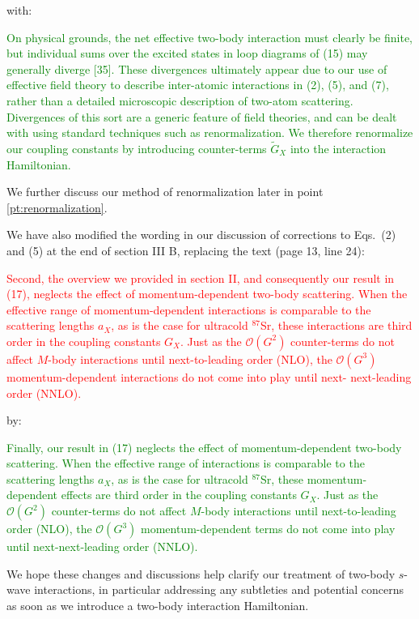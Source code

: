 \documentclass[preprint]{revtex4-1}
\newcommand{\p}[1]{\left(#1\right)} %
\renewcommand{\O}{\mathcal{O}}
\newcommand{\1}{\mathds{1}}
\newcommand{\red}[1]{\textcolor{red}{#1}}
\newcommand{\green}[1]{\textcolor{green}{#1}}
\begin{document}
\begin{enumerate}
  with:

  \green{On physical grounds, the net effective two-body interaction
    must clearly be finite, but individual sums over the excited
    states in loop diagrams of (15) may generally diverge [35].  These
    divergences ultimately appear due to our use of effective field
    theory to describe inter-atomic interactions in (2), (5), and (7),
    rather than a detailed microscopic description of two-atom
    scattering.  Divergences of this sort are a generic feature of
    field theories, and can be dealt with using standard techniques
    such as renormalization.  We therefore renormalize our coupling
    constants by introducing counter-terms $\tilde G_X$ into the
    interaction Hamiltonian.}

  We further discuss our method of renormalization later in point
  \ref{pt:renormalization}.

  We have also modified the wording in our discussion of corrections
  to Eqs.~(2) and (5) at the end of section III B, replacing the text
  (page 13, line 24):

  \red{Second, the overview we provided in section II, and
    consequently our result in (17), neglects the effect of
    momentum-dependent two-body scattering. When the effective range
    of momentum-dependent interactions is comparable to the scattering
    lengths $a_X$, as is the case for ultracold ${}^{87}$Sr, these
    interactions are third order in the coupling constants $G_X$. Just
    as the $\O\p{G^2}$ counter-terms do not affect $M$-body
    interactions until next-to-leading order (NLO), the $\O\p{G^3}$
    momentum-dependent interactions do not come into play until next-
    next-leading order (NNLO).}

  by:

  \green{Finally, our result in (17) neglects the effect of
    momentum-dependent two-body scattering.  When the effective range
    of interactions is comparable to the scattering lengths $a_X$, as
    is the case for ultracold ${}^{87}$Sr, these momentum-dependent
    effects are third order in the coupling constants $G_X$.  Just as
    the $\O\p{G^2}$ counter-terms do not affect $M$-body interactions
    until next-to-leading order (NLO), the $\O\p{G^3}$
    momentum-dependent terms do not come into play until
    next-next-leading order (NNLO).}

  We hope these changes and discussions help clarify our treatment of
  two-body $s$-wave interactions, in particular addressing any
  subtleties and potential concerns as soon as we introduce a two-body
  interaction Hamiltonian.



\end{enumerate}
\end{document}

